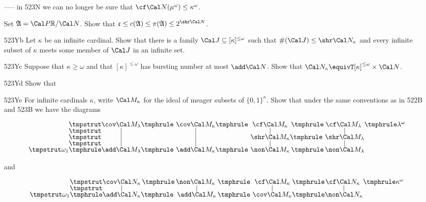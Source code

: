 {----- in 523N we can no longer be sure that
$\cf\Cal N(\mu^{\omega})\le\kappa^{\omega}$.


Set $\frak A=\Cal P\Bbb R/\Cal N$.   %
Show that
$\frak c\le c(\frak A)\le\pi(\frak A)\le 2^{\shr\Cal N}$.

\spheader 523Yb Let $\kappa$ be an infinite cardinal.   Show that there is
a family $\Cal J\subseteq[\kappa]^{\le\omega}$ such that
$\#(\Cal J)\le\shr\Cal N_{\kappa}$ and every infinite subset of $\kappa$
meets some member of $\Cal J$ in an infinite set.

\spheader 523Yc Suppose that $\kappa\ge\omega$ and that
$[\kappa]^{\le\omega}$ has bursting number at most $\add\Cal N$.   Show
that $\Cal N_{\kappa}\equivT[\kappa]^{\le\omega}\times\Cal N$.

\spheader 523Yd Show that


\spheader 523Ye For infinite cardinals $\kappa$, write $\Cal M_{\kappa}$
for the ideal of meager subsets of $\{0,1\}^{\kappa}$.   Show that under
the same conventions as in 522B and 523B we have the diagrams

$$\vbox{\offinterlineskip
\halign{\hfil#\hfil&\hfil#\hfil&\hfil#\hfil&\hfil#\hfil
  &\hfil#\hfil&\hfil#\hfil&\hfil#\hfil
  &\hfil#\hfil&\hfil#\hfil&\hfil#\hfil
  &\hfil#\hfil&\hfil#\hfil&\hfil#\hfil&\hfil#\hfil\cr
&\tmpstrut&$\cov\Cal M_{\lambda}$&\tmphrule
  &$\cov\Cal M_{\kappa}$&\tmphrule
  &$\cf\Cal M_{\kappa}$&\tmphrule&$\cf\Cal M_{\lambda}$
  &\tmphrule&$\lambda^{\omega}$\cr
&\tmpstrut&\vrule&&\vrule&&\vrule&&\vrule\cr
&\tmpstrut&\vrule&&\vrule&&$\shr\Cal M_{\kappa}$&\tmphrule
  &$\shr\Cal M_{\lambda}$\cr
&\tmpstrut&\vrule&&\vrule&&\vrule&&\vrule\cr
$\tmpstrut\omega_1$&\tmphrule&$\add\Cal M_{\lambda}$&\tmphrule
  &$\add\Cal M_{\kappa}$&\tmphrule
  &$\non\Cal M_{\kappa}$&\tmphrule&$\non\Cal M_{\lambda}$\cr
}}$$

\noindent and

$$\vbox{\offinterlineskip
\halign{\hfil#\hfil&\hfil#\hfil&\hfil#\hfil&\hfil#\hfil
  &\hfil#\hfil&\hfil#\hfil&\hfil#\hfil
  &\hfil#\hfil&\hfil#\hfil&\hfil#\hfil&\hfil#\hfil\cr
&\tmpstrut&$\cov\Cal N_{\kappa}$&\tmphrule&$\non\Cal M_{\kappa}$
  &\tmphrule
  &$\cf\Cal M_{\kappa}$&\tmphrule&$\cf\Cal N_{\kappa}$
  &\tmphrule&$\kappa^{\omega}$\cr
&\tmpstrut&\vrule&&\vrule&&\vrule&&\vrule\cr
$\tmpstrut\omega_1$&\tmphrule&$\add\Cal N_{\kappa}$&\tmphrule
  &$\add\Cal M_{\kappa}$&\tmphrule
  &$\cov\Cal M_{\kappa}$&\tmphrule&$\non\Cal N_{\kappa}$\cr
}}$$

}
